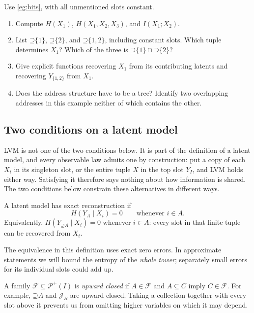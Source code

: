 \documentclass[11pt]{article}
\newcommand{\PI}{\mathcal{P}^{+}(I)}
\newcommand{\Up}{\mathord{\supseteq}}
\begin{document}
\begin{exercise}
\label{ex:bits}\important
Use \cref{eg:bits}, with all unmentioned slots constant.
\begin{enumerate}
\item Compute $H(X_1)$, $H(X_1,X_2,X_3)$, and $I(X_1;X_2)$.
\item List $\Up\{1\}$, $\Up\{2\}$, and $\Up\{1,2\}$, including
constant slots. Which tuple determines $X_1$? Which of the three is
$\Up\{1\}\cap\Up\{2\}$?
\item Give explicit functions recovering $X_1$ from its contributing latents
and recovering $Y_{\{1,2\}}$ from $X_1$.
\item Does the address structure have to be a tree? Identify two overlapping
addresses in this example neither of which contains the other.
\end{enumerate}
\end{exercise}

\subsection{Two conditions on a latent model}
\label{sec:conditions}
LVM is not one of the two conditions below. It is part of the definition of a
latent model, and every observable law admits one by construction: put a copy
of each $X_i$ in its singleton slot, or the entire tuple $X$ in the top slot
$Y_I$, and LVM holds either way. Satisfying it therefore says nothing about how
information is shared. The two conditions below constrain these alternatives in
different ways.

\begin{definition}[Reconstruction]
\label{def:reconstruction}
A latent model has exact reconstruction if
\[
 H(Y_A\mid X_i)=0\qquad\text{whenever }i\in A.
\]
Equivalently, $H(Y_{\Up A}\mid X_i)=0$ whenever $i\in A$: every slot
in that finite tuple can be recovered from $X_i$.
\end{definition}

The equivalence in this definition uses exact zero errors. In approximate
statements we will bound the entropy of the \emph{whole tower}; separately small
errors for its individual slots could add up.

A family $\mathcal{F}\subseteq\PI$ is \emph{upward closed} if
$A\in\mathcal{F}$ and $A\subseteq C$ imply $C\in\mathcal{F}$.
For example, $\Up A$ and $\mathcal{J}_B$ are upward closed. Taking a
collection together with every slot above it prevents us from omitting higher
variables on which it may depend.
\end{document}
